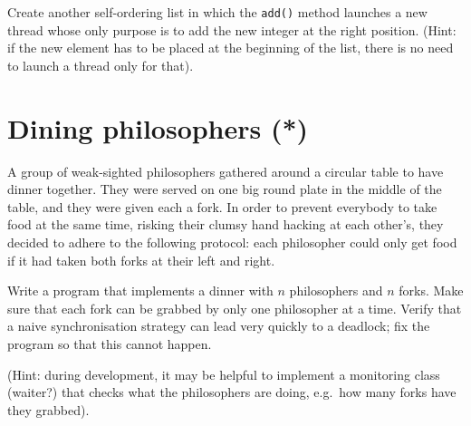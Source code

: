 \documentclass{article}
\begin{document}
Create another self-ordering list in which the \verb+add()+ method
launches a new thread whose only purpose is to add the new integer at
the right position. (Hint: if the new element has to be placed at the
beginning of the list, there is no need to launch a thread only for
that). 


\section{Dining philosophers (*)}
\label{sec:dining-philosophers}

A group of weak-sighted philosophers gathered around a circular table
to have dinner together. They were served on one big round plate in
the middle of the table, and they were given each a fork. In order to
prevent everybody to take food at the same time, risking their clumsy
hand hacking at each other's, they decided to adhere to the following
protocol: each philosopher could only get food if it had taken both
forks at their left and right. 

Write a program that implements a dinner with $n$ philosophers and $n$
forks. Make sure that each fork can be grabbed by only one philosopher
at a time. Verify that a naive synchronisation strategy can lead very
quickly to a deadlock; fix the program so that this cannot happen. 

(Hint: during development, it may be helpful to implement a monitoring
class (waiter?)  that checks what the philosophers are doing, e.g.~how
many forks have they grabbed).
\end{document}
